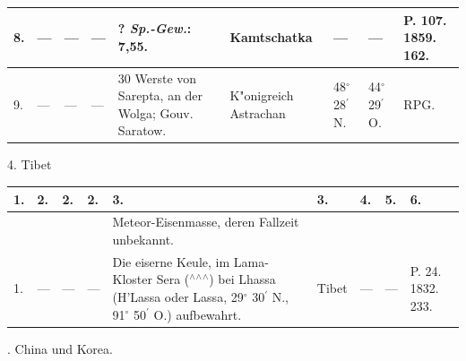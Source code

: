 \documentclass[a4paper, 8pt, oneside, polutonikogreek, german]{article}
\begin{document}
\begin{center}
\begin{longtable}{|p{3mm}|p{6mm}|p{4mm}|p{13mm}|p{22mm}|p{20mm}|p{13mm}|p{13mm}|p{13mm}|}
        8. & --- & --- & --- & ? \emph{Sp.-Gew.}: 7,55. & Kamtschatka & --- & --- & P. 107. 1859. 162. \\ \hline
        9. & --- & --- & --- & 30 Werste von Sarepta, an der Wolga; Gouv. Saratow. & K"onigreich Astrachan & 48$^\circ$ 28$^\prime$ N. & 44$^\circ$ 29$^\prime$ O. & RPG. \\ \hline
    \end{longtable}
\end{center}
4. Tibet
\begin{table}[H]
    \footnotesize
    \begin{longtable}{|p{3mm}|p{5mm}|p{4mm}|p{13mm}|p{22mm}|p{19mm}|p{13mm}|p{13mm}|p{13mm}|}
    \hline
        1. & 2. & 2. & 2. & 3. & 3. & 4. & 5. & 6. \\ \hline
          &   &   &   & Meteor-Eisenmasse, deren Fallzeit unbekannt. &   &   &   &   \\ \hline
        1. & --- & --- & --- & Die eiserne Keule, im Lama-Kloster Sera ($^\wedge$$^\wedge$$^\wedge$) bei Lhassa (H’Lassa oder Lassa, 29$^\circ$ 30$^\prime$ N., 91$^\circ$ 50$^\prime$ O.) aufbewahrt. & Tibet & --- & --- & P. 24. 1832. 233. \\ \hline
    \end{longtable}
\end{table}
. China und Korea.
\end{document}
